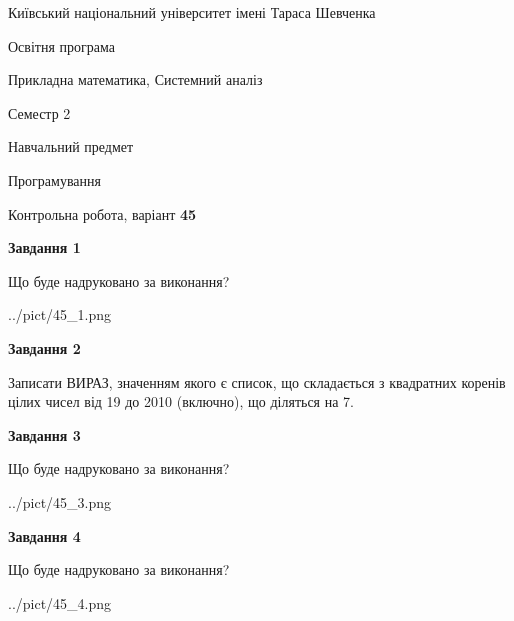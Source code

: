 \documentclass[12pt, ukrainian]{article}
\begin{document}
{{\begin {small}\par
{ \center  Київський національний університет імені Тараса Шевченка \par}
{\parbox {5 cm}{Освітня програма \hfill}{\parbox {8 cm}{Прикладна математика, Системний аналіз \hfill}}\parbox {5 cm}{\hfill Семестр 2}}\par
{\parbox {5 cm} {Навчальний предмет \hfill}\parbox {7 cm}{Програмування \hfill}\parbox {6cm}{\hfill}\par}\vspace{-7pt} \end{small}}{\center Контрольна робота, варіант  \No \textbf
{ 45 }\par}}
{
\begin {large}
{\begin {center}\textbf{Завдання 1}\end {center}}\par
Що буде надруковано за виконання?\par\par
\begin{center}
	{../pict/45_1.png}
\end{center}
\newpage

{\begin {center}\textbf{Завдання 2}\end {center}}\par

Записати ВИРАЗ, значенням якого є список, що складається з квадратних коренів цілих чисел від 19 до 2010 (включно), що діляться на 7.\par
\newpage

{\begin {center}\textbf{Завдання 3}\end {center}}\par
Що буде надруковано за виконання?
\begin{center}
	{../pict/45_3.png}
\end{center}
\newpage

{\begin {center}\textbf{Завдання 4}\end {center}}\par
Що буде надруковано за виконання?\par
\begin{center}
	{../pict/45_4.png}
\end{center}
\newpage


\end{large}}
\end{document}
